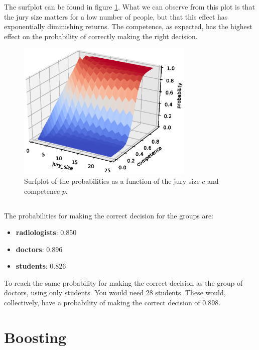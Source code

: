 \documentclass[11pt]{article}
\begin{document}
The surfplot can be found in figure \ref{fig:surf_probs}. What we can observe from this plot is that the jury size matters for a low number of people, but that this effect has exponentially diminishing returns. The competence, as expected, has the highest effect on the probability of correctly making the right decision.

\begin{figure}[H]
	\centering
	\includegraphics[width=0.75\textwidth]{images/surfplot_probs.eps}
	\caption{Surfplot of the probabilities as a function of the jury size $c$ and competence $p$.}
	\label{fig:surf_probs}
\end{figure}

\subsection{}
The probabilities for making the correct decision for the groups are:
\begin{itemize}
	\item \textbf{radiologists}: $0.850$
	\item \textbf{doctors}: $0.896$
	\item \textbf{students}: $0.826$
\end{itemize}
To reach the same probability for making the correct decision as the group of doctors, using only students. You would need 28 students. These would, collectively, have a probability of making the correct decision of $0.898$.

\section{}

\section*{Boosting}
\section{}
\end{document}
